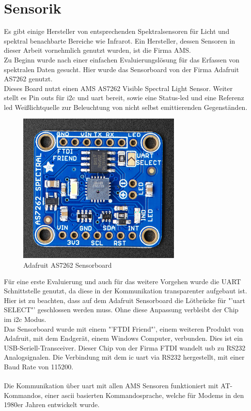 \documentclass[11pt]{scrartcl}
\begin{document}
\section{Sensorik}
Es gibt einige Hersteller von entsprechenden Spektralsensoren für Licht und spektral benachbarte Bereiche wie Infrarot.
Ein Hersteller, dessen Sensoren in dieser Arbeit vornehmlich genutzt wurden, ist die Firma AMS.\\
Zu Beginn wurde nach einer einfachen Evaluierungslösung für das Erfassen von spektralen Daten gesucht. Hier wurde das
Sensorboard von der Firma Adafruit AS7262 genutzt. \cite{adafruit}\\
Dieses Board nutzt einen AMS AS7262 Visible Spectral Light Sensor. Weiter stellt es Pin outs für \ac{i2c} und \ac{uart} bereit,
sowie eine Status-\ac{led} und eine Referenz \ac{led} Weißlichtquelle zur Beleuchtung von nicht selbst emittierenden
Gegenständen.
\begin{figure}[H]
    \begin{center}
        \includegraphics[width=.48\textwidth]{images/AS7262_front.png}
    \end{center}
    \caption{Adafruit AS7262 Sensorboard \cite{adafruit}}
\end{figure}
\noindent
Für eine erste Evaluierung und auch für das weitere Vorgehen wurde die UART Schnittstelle genutzt, da diese in der Kommunikation
transparenter aufgebaut ist.\\
Hier ist zu beachten, dass auf dem Adafruit Sensorboard die Lötbrücke für "'\ac{uart} SELECT"' geschlossen werden muss. Ohne diese
Anpassung verbleibt der Chip im \ac{i2c} Modus.\\
Das Sensorboard wurde mit einem "'FTDI Friend"', einem weiteren Produkt von Adafruit, mit dem Endgerät, einem Windows Computer, verbunden.
Dies ist ein USB-Seriell-Transceiver. Dieser Chip von der Firma FTDI wandelt \ac{usb} zu RS232 Analogsignalen. Die Verbindung mit dem \ac{ic}
\ac{uart} via RS232 hergestellt, mit einer Baud Rate von 115200.\\
\\
Die Kommunikation über \ac{uart} mit allen AMS Sensoren funktioniert mit AT-Kommandos, einer \ac{ascii} basierten Kommandosprache,
welche für Modems in den 1980er Jahren entwickelt wurde.
\end{document}
